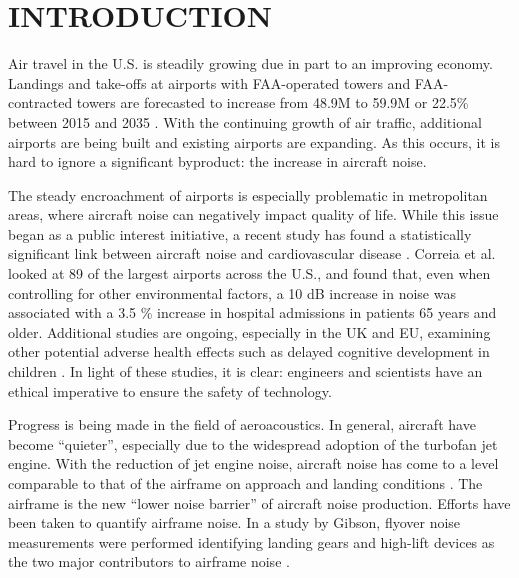 %
%
%
%
%
%
%
%
%
%


%
%

\chapter{INTRODUCTION}
Air travel in the U.S. is steadily growing due in part to an improving economy. Landings and take-offs at airports with FAA-operated towers and FAA-contracted towers are forecasted to increase from 48.9M to 59.9M or 22.5\% between 2015 and 2035 \cite{faa2015}. With the continuing growth of air traffic, additional airports are being built and existing airports are expanding. As this occurs, it is hard to ignore a significant byproduct: the increase in aircraft noise.

The steady encroachment of airports is especially problematic in metropolitan areas, where aircraft noise can negatively impact quality of life. While this issue began as a public interest initiative, a recent study has found a statistically significant link between aircraft noise and cardiovascular disease \cite{correia2013}. Correia et al. looked at 89 of the largest airports across the U.S., and found that, even when controlling for other environmental factors, a 10 dB increase in noise was associated with a 3.5 \% increase in hospital admissions in patients 65 years and older. Additional studies are ongoing, especially in the UK and EU, examining other potential adverse health effects such as delayed cognitive development in children \cite{cap2014}. In light of these studies, it is clear: engineers and scientists have an ethical imperative to ensure the safety of technology. 

Progress is being made in the field of aeroacoustics. In general, aircraft have become ``quieter'', especially due to the widespread adoption of the turbofan jet engine. With the reduction of jet engine noise, aircraft noise has come to a level comparable to that of the airframe on approach and landing conditions \cite{dob2010}. The airframe is the new ``lower noise barrier'' of aircraft noise production. Efforts have been taken to quantify airframe noise. In a study by Gibson, flyover noise measurements were performed identifying landing gears and high-lift devices as the two major contributors to airframe noise \cite{gibson1974}.

